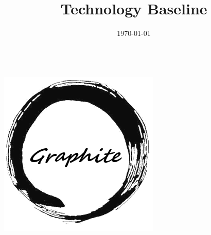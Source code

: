 \documentclass[openany,12pt,a4paper]{report}
\title{Technology Baseline}
\author{}
\date{\today}
\begin{document}
	\makeatletter
	\begin{titlepage}
		\begin{center}
			{\huge \bfseries  \@title }\\[10em]
			\includegraphics[width=0.5\linewidth]{./img/logo.png} \\[5em]
			
			{\large \@date}
		\end{center}
	\end{titlepage}
	\makeatother
	\thispagestyle{empty}
	\newpage
	\tableofcontents
	
	
	
	

	
\end{document}
